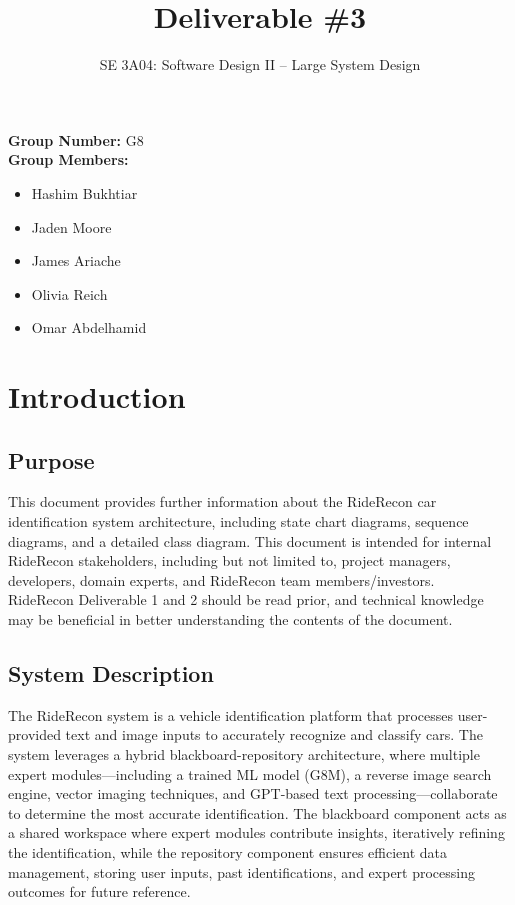 \documentclass[]{article}
\title{Deliverable \#3}
\author{SE 3A04: Software Design II -- Large System Design}
\date{}
\begin{document}
\maketitle	

{\noindent\bf Group Number:} G8 \\
{\bf Group Members:} 
\begin{itemize}
	\item Hashim Bukhtiar
	\item Jaden Moore
	\item James Ariache
	\item Olivia Reich
	\item Omar Abdelhamid
\end{itemize}

\section{Introduction}
\label{sec:introduction}

\subsection{Purpose}
\label{sub:purpose}

This document provides further information about the RideRecon car identification system architecture, including state chart diagrams, sequence diagrams, and a detailed class diagram. This document is intended for internal RideRecon stakeholders, including but not limited to, project managers, developers, domain experts, and RideRecon team members/investors. \\

\noindent RideRecon Deliverable 1 and 2 should be read prior, and technical knowledge may be beneficial in better understanding the contents of the document.



\subsection{System Description}
\label{sub:system_description}

The RideRecon system is a vehicle identification platform that processes user-provided text and image inputs to accurately recognize and classify cars. The system leverages a hybrid blackboard-repository architecture, where multiple expert modules—including a trained ML model (G8M), a reverse image search engine, vector imaging techniques, and GPT-based text processing—collaborate to determine the most accurate identification. The blackboard component acts as a shared workspace where expert modules contribute insights, iteratively refining the identification, while the repository component ensures efficient data management, storing user inputs, past identifications, and expert processing outcomes for future reference.\\
\end{document}
